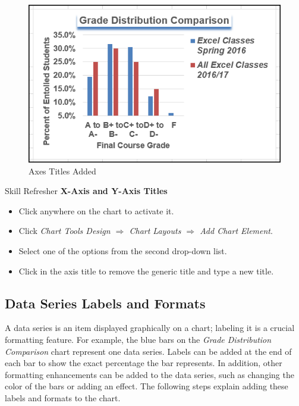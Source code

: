 \begin{figure}[H]
	\centering
	\includegraphics[width=\maxwidth{.95\linewidth}]{gfx/ch04_fig36}
	\caption{Axes Titles Added}
	\label{04:fig36}
\end{figure}

\begin{center}
	\begin{sklbox}{Skill Refresher}
		\textbf{X-Axis and Y-Axis Titles}
		\\
		\begin{itemize}
			\setlength{\itemsep}{0pt}
			\setlength{\parskip}{0pt}
			\setlength{\parsep}{0pt}

			\item Click anywhere on the chart to activate it.
			\item Click \textit{Chart Tools Design $ \Rightarrow $ Chart Layouts $ \Rightarrow $ Add Chart Element}.
			\item Select one of the options from the second drop-down list.
			\item Click in the axis title to remove the generic title and type a new title.
			
		\end{itemize}
	\end{sklbox}
\end{center}

\subsection{Data Series Labels and Formats}

A data series is an item displayed graphically on a chart; labeling it is a crucial formatting feature. For example, the blue bars on the \textit{Grade Distribution Comparison} chart represent one data series. Labels can be added at the end of each bar to show the exact percentage the bar represents. In addition, other formatting enhancements can be added to the data series, such as changing the color of the bars or adding an effect. The following steps explain adding these labels and formats to the chart.

